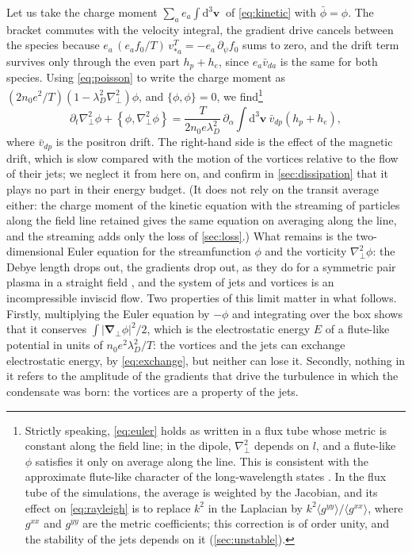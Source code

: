 \documentclass{jpp}
\newcommand{\rmd}{\text{d}}
\newcommand{\pt}{\partial_t}
\renewcommand{\vec}[1]{\boldsymbol{#1}}
\newcommand{\vec}[1]{\boldsymbol{#1}}
\newcommand{\grad}{{\vec{\nabla}}}
\newcommand{\intv}[1][3]{{\int \rmd^{#1} \vec{v} \ }}
\newcommand{\pbra}[2]{\left\lbrace #1, #2 \right\rbrace}
\newcommand{\pbrainline}[2]{\lbrace #1, #2 \rbrace}
\newcommand{\lambdaD}{\lambda_D}
\newcommand{\phibar}{\bar\phi}
\newcommand{\vda}{\bar v_{da}}
\begin{document}
Let us take the charge moment \(\sum_a e_a\intv\) of \cref{eq:kinetic} with \(\phibar = \phi\). The bracket commutes with the velocity integral, the gradient drive cancels between the species because \(e_a\,(e_af_0/T)\,v_{*a}^T = -e_a\,\partial_\psi f_0\) sums to zero, and the drift term survives only through the even part \(h_p + h_e\), since \(e_a\vda\) is the same for both species. Using \cref{eq:poisson} to write the charge moment as \((2n_0e^2/T)(1-\lambdaD^2\nabla_\perp^2)\phi\), and \(\pbrainline{\phi}{\phi} = 0\), we find\footnote{Strictly speaking, \cref{eq:euler} holds as written in a flux tube whose metric is constant along the field line; in the dipole, \(\nabla_\perp^2\) depends on \(l\), and a flute-like \(\phi\) satisfies it only on average along the line. This is consistent with the approximate flute-like character of the long-wavelength states \citep{KennedyPlunkManuscript}. In the flux tube of the simulations, the average is weighted by the Jacobian, and its effect on \cref{eq:rayleigh} is to replace \(k^2\) in the Laplacian by \(k^2\langle g^{yy}\rangle/\langle g^{xx}\rangle\), where \(g^{xx}\) and \(g^{yy}\) are the metric coefficients; this correction is of order unity, and the stability of the jets depends on it (\cref{sec:unstable}).}
\begin{equation}
\pt\nabla_\perp^2\phi + \pbra{\phi}{\nabla_\perp^2\phi} = \frac{T}{2n_0e\lambdaD^2}\,\partial_\alpha\intv\bar v_{dp}\left(h_p + h_e\right),
\label{eq:euler}
\end{equation}
where \(\bar v_{dp}\) is the positron drift. The right-hand side is the effect of the magnetic drift, which is slow compared with the motion of the vortices relative to the flow of their jets; we neglect it from here on, and confirm in \cref{sec:dissipation} that it plays no part in their energy budget. (It does not rely on the transit average either: the charge moment of the kinetic equation with the streaming of particles along the field line retained gives the same equation on averaging along the line, and the streaming adds only the loss of \cref{sec:loss}.) What remains is the two-dimensional Euler equation for the streamfunction \(\phi\) and the vorticity \(\nabla_\perp^2\phi\): the Debye length drops out, the gradients drop out, as they do for a symmetric pair plasma in a straight field \citep{Helander2014}, and the system of jets and vortices is an incompressible inviscid flow. Two properties of this limit matter in what follows. Firstly, multiplying the Euler equation by \(-\phi\) and integrating over the box shows that it conserves \(\int|\grad_\perp\phi|^2/2\), which is the electrostatic energy \(E\) of a flute-like potential in units of \(n_0e^2\lambdaD^2/T\): the vortices and the jets can exchange electrostatic energy, by \cref{eq:exchange}, but neither can lose it. Secondly, nothing in it refers to the amplitude of the gradients that drive the turbulence in which the condensate was born: the vortices are a property of the jets.
\end{document}
